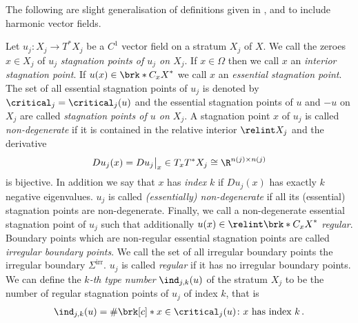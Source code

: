 The following are slight generalisation of definitions given in \cite[p.138f]{Shelton1980}, \cite[§5]{Morse1969} and \cite[p.282f]{Morse1970}
to include harmonic vector fields.
\begin{definition}\label{df:nonDegeneracy}
  Let $u_j\colon X_j\to T^*X_j$ be a $C^1$ vector field on a stratum $X_j$ of $X$.
  We call the zeroes $x\in X_j$ of $u_j$ \emph{stagnation points of $u_j$ on $X_j$}.
  If $x\in\Omega$ then we call $x$ an \emph{interior stagnation point}.
  If $u(x)\in \brk*{C_xX}^*$ we call $x$ an \emph{essential stagnation point}.
  The set of all essential stagnation points of $u_j$ is denoted by $\critical_j=\critical_j(u)$ and
  the essential stagnation points of $u$ and $-u$ on $X_j$ are called \emph{stagnation points of $u$ on $X_j$}.
  A stagnation point $x$ of $u_j$ is called
  \emph{non-degenerate} if it is contained in the relative interior $\relint X_j$
  and the derivative
  \begin{align*}
    Du_j(x)=Du_j\big\vert_x\in T_xT^*X_j\cong \R^{n(j)\times n(j)}
  \end{align*}
  is bijective.
  In addition we say that $x$ has \emph{index} $k$
  if $Du_j(x)$ has exactly $k$ negative eigenvalues.
  $u_j$ is called \emph{(essentially) non-degenerate} if all its (essential) stagnation points
  are non-degenerate.
  Finally, we call a non-degenerate essential stagnation point of $u_j$ such that additionally $u(x)\in\relint \brk*{C_xX}^*$
  \emph{regular}.
  Boundary points which are non-regular essential stagnation points are called \emph{irregular boundary points}.
  We call the set of all irregular boundary points the irregular boundary $\Sigma^\text{irr}$.
  $u_j$ is called \emph{regular} if it has no irregular boundary points.
  We can define the \emph{$k$-th type number} $\ind_{j,k}(u)$ of the
  stratum $X_j$ to be the number of regular stagnation points of $u_j$ of index $k$,
  that is
  \begin{align}
    \ind_{j,k}(u)=\#\brk[c]*{x\in\critical_j(u)\colon x\text{ has index }k}\,.\label{eq:def_typenbr_strata}
  \end{align}
\end{definition}

